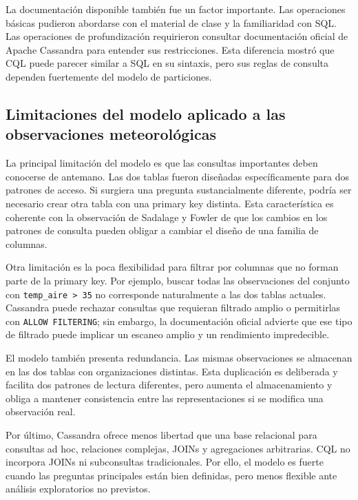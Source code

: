 La documentación disponible también fue un factor importante. Las operaciones básicas pudieron abordarse con el material de clase y la familiaridad con SQL. Las operaciones de profundización requirieron consultar documentación oficial de Apache Cassandra para entender sus restricciones. Esta diferencia mostró que CQL puede parecer similar a SQL en su sintaxis, pero sus reglas de consulta dependen fuertemente del modelo de particiones.

\subsection{Limitaciones del modelo aplicado a las observaciones meteorológicas}

La principal limitación del modelo es que las consultas importantes deben conocerse de antemano. Las dos tablas fueron diseñadas específicamente para dos patrones de acceso. Si surgiera una pregunta sustancialmente diferente, podría ser necesario crear otra tabla con una primary key distinta. Esta característica es coherente con la observación de Sadalage y Fowler de que los cambios en los patrones de consulta pueden obligar a cambiar el diseño de una familia de columnas. \parencite[cap.~10, p.~109]{sadalage2012}

Otra limitación es la poca flexibilidad para filtrar por columnas que no forman parte de la primary key. Por ejemplo, buscar todas las observaciones del conjunto con \texttt{temp\_aire > 35} no corresponde naturalmente a las dos tablas actuales. Cassandra puede rechazar consultas que requieran filtrado amplio o permitirlas con \texttt{ALLOW FILTERING}; sin embargo, la documentación oficial advierte que ese tipo de filtrado puede implicar un escaneo amplio y un rendimiento impredecible. \parencite{cassandra_dml}

El modelo también presenta redundancia. Las mismas observaciones se almacenan en las dos tablas con organizaciones distintas. Esta duplicación es deliberada y facilita dos patrones de lectura diferentes, pero aumenta el almacenamiento y obliga a mantener consistencia entre las representaciones si se modifica una observación real.

Por último, Cassandra ofrece menos libertad que una base relacional para consultas ad hoc, relaciones complejas, JOINs y agregaciones arbitrarias. CQL no incorpora JOINs ni subconsultas tradicionales. \parencite[cap.~10, p.~106]{sadalage2012} Por ello, el modelo es fuerte cuando las preguntas principales están bien definidas, pero menos flexible ante análisis exploratorios no previstos.

